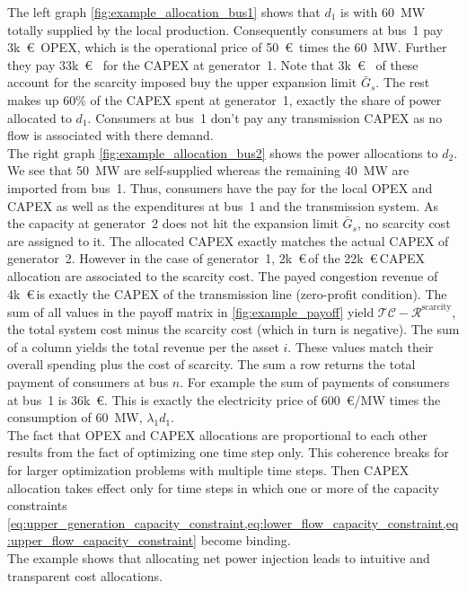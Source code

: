\documentclass[11pt,twocolumn]{article}
\newcommand{\kk}{k~\euro\,}
\newcommand{\capacitygenerationupper}{\bar{G}_{s}}
\newcommand{\totalcost}{\mathcal{TC}}
\newcommand{\remainingcost}{\mathcal{R}}
\newcommand{\scarcitycost}{\remainingcost^\text{scarcity}}
\begin{document}
The left graph \cref{fig:example_allocation_bus1} shows that $d_1$ is with 60~MW totally supplied by the local production. Consequently consumers at bus~1 pay 3k~\euro~OPEX, which is the operational price of 50~\euro\, times the 60~MW. Further they pay 33k~\euro~ for the CAPEX at generator~1. Note that 3k~\euro~ of these account for the scarcity imposed buy the upper expansion limit $\capacitygenerationupper$. The rest makes up 60\% of the CAPEX spent at generator~1, exactly the share of power allocated to $d_1$. Consumers at bus~1 don't pay any transmission CAPEX as no flow is associated with there demand. \\
The right graph \cref{fig:example_allocation_bus2} shows the power allocations to $d_2$. We see that 50~MW are self-supplied whereas the remaining 40~MW are imported from bus~1. Thus, consumers have the pay for the local OPEX and CAPEX as well as the expenditures at bus~1 and the transmission system. As the capacity at generator~2 does not hit the expansion limit $\capacitygenerationupper$, no scarcity cost are assigned to it. The allocated CAPEX exactly matches the actual CAPEX of generator~2. However in the case of generator~1, 2\kk of the 22\kk CAPEX allocation are associated to the scarcity cost. The payed congestion revenue of 4\kk is exactly the CAPEX of the transmission line (zero-profit condition).   
% 
The sum of all values in the payoff matrix in \cref{fig:example_payoff} yield $\totalcost - \scarcitycost$, the total system cost minus the scarcity cost (which in turn is negative).
The sum of a column  yields the total revenue per the asset $i$. These values match their overall spending plus the cost of scarcity. The sum a row returns the total payment of consumers at bus $n$. For example the sum of payments of consumers at bus~1 is 36k~\euro. This is exactly the electricity price of 600~\euro/MW times the consumption of 60~MW, $\lambda_1 d_1$. \\
% 

The fact that OPEX and CAPEX allocations are proportional to each other results from the fact of optimizing one time step only. This coherence breaks for for larger optimization problems with multiple time steps. Then CAPEX allocation takes effect only for time steps in which one or more of the capacity constraints  \cref{eq:upper_generation_capacity_constraint,eq:lower_flow_capacity_constraint,eq:upper_flow_capacity_constraint} become binding.  \\
The example shows that allocating net power injection leads to intuitive and transparent  cost allocations. 
\end{document}
